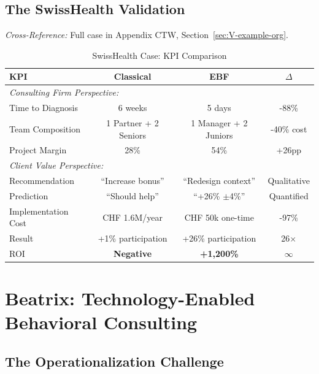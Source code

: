 \subsection{The SwissHealth Validation}

\textit{Cross-Reference:} Full case in Appendix CTW, Section~\ref{sec:V-example-org}.

\begin{table}[htbp]
\centering
\caption{SwissHealth Case: KPI Comparison}
\label{tab:swisshealth-kpis}
\renewcommand{\arraystretch}{1.3}
\begin{tabular}{@{}lccc@{}}
\toprule
\textbf{KPI} & \textbf{Classical} & \textbf{EBF} & \textbf{$\Delta$} \\
\midrule
\multicolumn{4}{l}{\textit{Consulting Firm Perspective:}} \\
Time to Diagnosis & 6 weeks & 5 days & -88\% \\
Team Composition & 1 Partner + 2 Seniors & 1 Manager + 2 Juniors & -40\% cost \\
Project Margin & 28\% & 54\% & +26pp \\
\midrule
\multicolumn{4}{l}{\textit{Client Value Perspective:}} \\
Recommendation & ``Increase bonus'' & ``Redesign context'' & Qualitative \\
Prediction & ``Should help'' & ``+26\% $\pm$4\%'' & Quantified \\
Implementation Cost & CHF 1.6M/year & CHF 50k one-time & -97\% \\
Result & +1\% participation & +26\% participation & 26$\times$ \\
ROI & \textbf{Negative} & \textbf{+1,200\%} & $\infty$ \\
\bottomrule
\end{tabular}
\end{table}



\section{Beatrix: Technology-Enabled Behavioral Consulting}
\label{sec:consulting-beatrix}

\subsection{The Operationalization Challenge}

